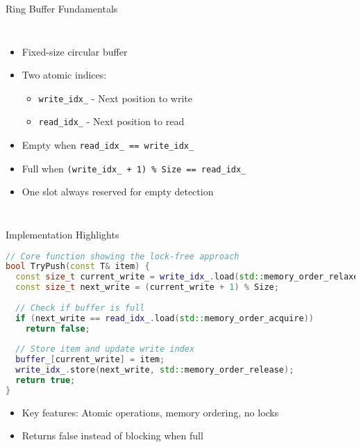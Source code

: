 \documentclass{beamer}
\begin{document}
\begin{frame}{Ring Buffer Fundamentals}
\begin{columns}
    \begin{itemize}
        \item Fixed-size circular buffer
        \item Two atomic indices:
        \begin{itemize}
            \item \texttt{write\_idx\_} - Next position to write
            \item \texttt{read\_idx\_} - Next position to read
        \end{itemize}
        \item Empty when \texttt{read\_idx\_ == write\_idx\_}
        \item Full when \texttt{(write\_idx\_ + 1) \% Size == read\_idx\_}
        \item One slot always reserved for empty detection
    \end{itemize}

\end{columns}
\end{frame}

\begin{frame}[fragile]{Implementation Highlights}
\begin{lstlisting}[language=C++]
// Core function showing the lock-free approach
bool TryPush(const T& item) {
  const size_t current_write = write_idx_.load(std::memory_order_relaxed);
  const size_t next_write = (current_write + 1) % Size;
  
  // Check if buffer is full
  if (next_write == read_idx_.load(std::memory_order_acquire))
    return false;
  
  // Store item and update write index
  buffer_[current_write] = item;
  write_idx_.store(next_write, std::memory_order_release);
  return true;
}
\end{lstlisting}

\begin{itemize}
    \item Key features: Atomic operations, memory ordering, no locks
    \item Returns false instead of blocking when full
\end{itemize}
\end{frame}
\end{document}
